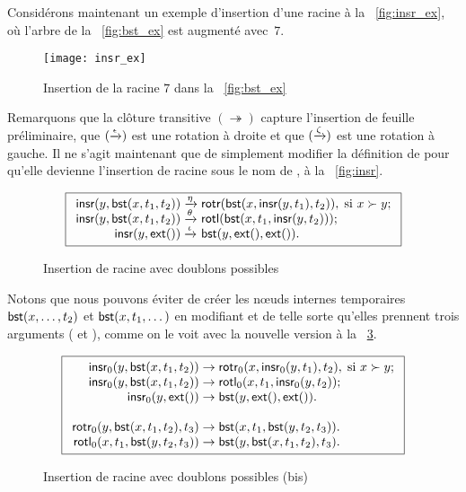 Considérons maintenant un exemple d'insertion d'une racine à la
\fig~\vref{fig:insr_ex}, où l'arbre de la \fig~\vref{fig:bst_ex} est
augmenté avec~\(7\).
\begin{figure}
\centering
\texttt{[image: insr\_ex]}%
\caption{Insertion de la racine \(7\) dans la \fig~\vref{fig:bst_ex}}
\label{fig:insr_ex}
\end{figure}
Remarquons que la clôture transitive \((\twoheadrightarrow)\) capture
l'insertion de feuille préliminaire, que
\((\xrightarrow{\smash{\epsilon}})\) est une rotation à droite et que
\((\xrightarrow{\smash{\zeta}})\) est une rotation à gauche. Il ne
s'agit maintenant que de simplement modifier la définition de
 pour qu'elle devienne l'insertion de racine sous le nom
de , à la \fig~\vref{fig:insr}.
\begin{figure}
\begin{equation*}
\boxed{
\begin{array}{r@{\;}l@{\;}l}
\fun{insr}(y,\fun{bst}(x,t_1,t_2)) & \xrightarrow{\smash{\eta}} &
  \fun{rotr}(\fun{bst}(x,\fun{insr}(y,t_1),t_2)),
  \; \text{si \(x \succ y\)};\\
\fun{insr}(y,\fun{bst}(x,t_1,t_2)) & \xrightarrow{\smash{\theta}} &
  \fun{rotl}(\fun{bst}(x,t_1,\fun{insr}(y,t_2)));\\
\fun{insr}(y,\fun{ext}()) & \xrightarrow{\smash{\iota}} & \fun{bst}(y,\fun{ext}(),\fun{ext}()).
\end{array}}
\end{equation*}
\caption{Insertion de racine avec doublons possibles}
\label{fig:insr}
\end{figure}
Notons que nous pouvons éviter de créer les n{\oe}uds internes
temporaires \(\textsf{bst}(x,\dots,t_2)\) et \(\textsf{bst}(x,t_1,\dots)\)
en modifiant  et  de telle sorte qu'elles
prennent trois arguments ( et ),
comme on le voit avec la nouvelle version  à la
\fig~\ref{fig:insr0}.
\begin{figure}[b]
\begin{equation*}
\boxed{
\begin{array}{r@{\;}l@{\;}l}
\fun{insr}_0(y,\fun{bst}(x,t_1,t_2)) & \rightarrow &
  \fun{rotr}_0(x,\fun{insr}_0(y,t_1),t_2),
  \; \text{si \(x \succ y\)};\\
\fun{insr}_0(y,\fun{bst}(x,t_1,t_2)) & \rightarrow &
  \fun{rotl}_0(x,t_1,\fun{insr}_0(y,t_2));\\
\fun{insr}_0(y,\fun{ext}()) & \rightarrow &
\fun{bst}(y,\fun{ext}(),\fun{ext}()).\\
\\
\fun{rotr}_0(y,\fun{bst}(x,t_1,t_2),t_3)
& \rightarrow & \fun{bst}(x,t_1,\fun{bst}(y,t_2,t_3)).\\
\fun{rotl}_0(x,t_1,\fun{bst}(y,t_2,t_3))
& \rightarrow & \fun{bst}(y,\fun{bst}(x,t_1,t_2),t_3).
\end{array}}
\end{equation*}
\caption{Insertion de racine avec doublons possibles (bis)}
\label{fig:insr0}
\end{figure}

